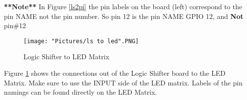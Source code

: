 \documentclass[12pt]{article}
\begin{document}
\textbf{**Note**} In Figure \ref{ls2pi} the pin labels on the board (left) correspond to the pin NAME not the pin number. So pin 12 is the pin NAME GPIO 12, and \textbf{Not} pin\#12 

\begin{figure}[H]
 	\centering
	\texttt{[image: "Pictures/ls to led".PNG]}
 	\caption{Logic Shifter to LED Matrix}
	\label{ls2led}
\end{figure}

Figure \ref{ls2led} shows the connections out of the Logic Shifter board to the LED Matrix. Make sure to use the INPUT side of the LED matrix. Labels of the pin namings can be found directly on the LED Matrix.  
\end{document}
